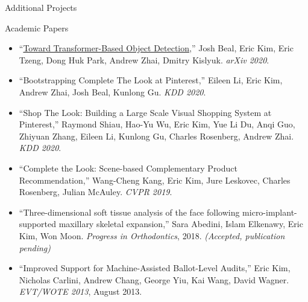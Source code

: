 \documentclass{resume}
\begin{document}
\begin{component}{Additional Projects}
\begin{itemize}
	\end{itemize}
\end{component}

\vspace{-0.75em}

\begin{component}{Academic Papers}
\vspace{-0.25em}
\begin{itemize}
\item[] ``\href{https://arxiv.org/abs/2012.09958}{Toward Transformer-Based Object Detection},'' Josh Beal, Eric Kim, Eric Tzeng, Dong Huk Park, Andrew Zhai, Dmitry Kislyuk. \emph{arXiv 2020}.
\vspace{-0.5em}
\item[] ``Bootstrapping Complete The Look at Pinterest,'' Eileen Li, Eric Kim, Andrew Zhai, Josh Beal, Kunlong Gu. \emph{KDD 2020}.
\vspace{-1.0em}
\item[] ``Shop The Look: Building a Large Scale Visual Shopping System at Pinterest,'' Raymond Shiau, Hao-Yu Wu, Eric Kim, Yue Li Du, Anqi Guo, Zhiyuan Zhang, Eileen Li, Kunlong Gu, Charles Rosenberg, Andrew Zhai. \emph{KDD 2020}.
\vspace{-0.5em}
\item[] ``Complete the Look: Scene-based Complementary Product Recommendation,'' Wang-Cheng Kang, Eric Kim, Jure Leskovec, Charles Rosenberg, Julian McAuley. \emph{CVPR 2019}.
\vspace{-0.5em}
\item[] ``Three-dimensional soft tissue analysis of the face following micro-implant-supported maxillary skeletal expansion,'' Sara Abedini, Islam Elkenawy, Eric Kim, Won Moon. \emph{Progress in Orthodontics}, 2018. \emph{(Accepted, publication pending)}
  \vspace{-0.5em}
        \item[] ``Improved Support for Machine-Assisted Ballot-Level Audits,'' Eric Kim, Nicholas Carlini, Andrew Chang, George Yiu, Kai Wang, David Wagner. \emph{EVT/WOTE 2013}, August 2013.

\end{itemize}
\end{component}
\end{document}
